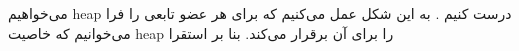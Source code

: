 می‌خواهیم 
heap
درست کنیم
.
به این شکل عمل می‌کنیم که برای هر عضو تابعی را فرا می‌خوانیم که خاصیت 
heap 
را برای آن برقرار می‌کند.
 بنا بر استقرا 